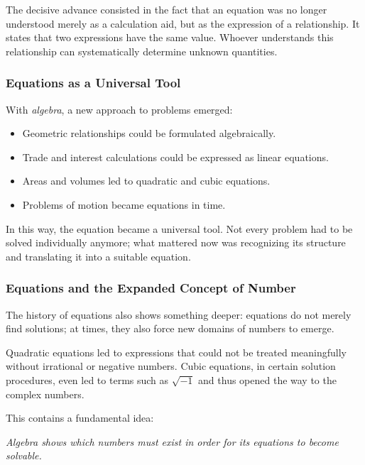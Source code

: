 The decisive advance consisted in the fact
that an equation was no longer understood merely as a calculation aid,
but as the expression of a relationship.
It states that two expressions have the same value.
Whoever understands this relationship
can systematically determine unknown quantities.

\subsubsection*{Equations as a Universal Tool}
With \emph{algebra}, a new approach to problems emerged:

\begin{itemize}
	\item Geometric relationships could be formulated algebraically.
	\item Trade and interest calculations could be expressed as linear equations.
	\item Areas and volumes led to quadratic and cubic equations.
	\item Problems of motion became equations in time.
\end{itemize}

In this way, the equation became a universal tool.
Not every problem had to be solved individually anymore;
what mattered now was recognizing its structure
and translating it into a suitable equation.

\subsubsection*{Equations and the Expanded Concept of Number}
The history of equations also shows something deeper:
equations do not merely find solutions;
at times, they also force new domains of numbers to emerge.

Quadratic equations led to expressions
that could not be treated meaningfully without irrational or negative numbers.
Cubic equations, in certain solution procedures, even led to terms such as \(\sqrt{-1}\)
and thus opened the way to the complex numbers.

This contains a fundamental idea:
\medskip

\textit{Algebra shows which numbers must exist
	in order for its equations to become solvable.}

\medskip

